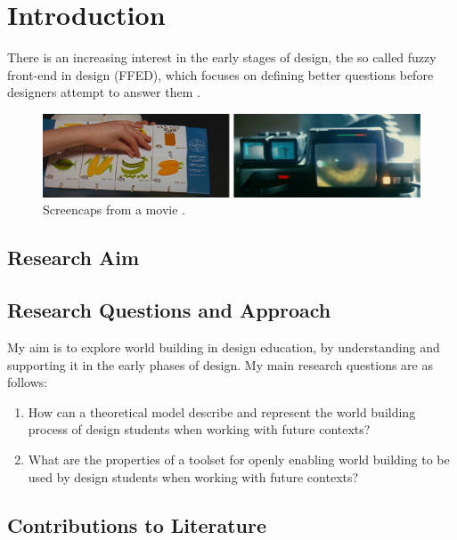 \chapter{Introduction}
\label{chp:b1}

	There is an increasing interest in the early stages of design, the so called fuzzy front-end in design (FFED), which focuses on defining better questions before designers attempt to answer them \cite{aaltonenHowWeMake2005}.
	

	\begin{figure}[h!]
			\centering
			\includegraphics[width=.8\textwidth]{figures/2001-Bladerunner.jpg}
			\caption{Screencaps from a movie \cite{bladeRunner}.}
			\label{fig:movies}
	\end{figure}

	
	\section{Research Aim}
	

\section{Research Questions and Approach}
\label{Research Questions}
	My aim is to explore world building in design education, by understanding and supporting it in the early phases of design. My main research questions are as follows: 

	\begin{enumerate}
	\item How can a theoretical model describe and represent the world building process of design students when working with future contexts?
	\item What are the properties of a toolset for openly enabling world building to be used by design students when working with future contexts?
	\end{enumerate}


\section{Contributions to Literature}


